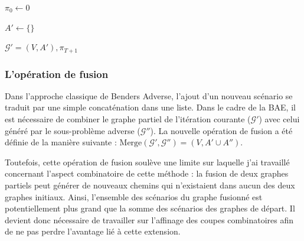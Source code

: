 \documentclass[12pt, a4paper, twoside]{article}
\numberwithin{equation}{section}
\begin{document}
    \begin{algorithm}[H]
        \caption{Adv\_subGraph}
        \label{alg:adv_subgraph}
        
        
        $\pi_0 \gets 0$\;
        
        
        $A' \gets \{\}$\;
        
        
        \Return $\mathcal{G}'=(V, A'), \pi_{T+1}$\;
    \end{algorithm}

	\subsubsection{L'opération de fusion}

	Dans l'approche classique de Benders Adverse, l'ajout d'un nouveau scénario se traduit par une simple concaténation dans une liste. Dans le cadre de la BAE, il est nécessaire de combiner le graphe partiel de l'itération courante ($\mathcal{G}'$) avec celui généré par le sous-problème adverse ($\mathcal{G}''$). La nouvelle opération de fusion a été définie de la manière suivante : $\text{Merge}(\mathcal{G}', \mathcal{G}'')=(V, A'\cup A'')$.
	
	Toutefois, cette opération de fusion soulève une limite sur laquelle j'ai travaillé concernant l'aspect combinatoire de cette méthode \cite{portoleauTHESIS} : la fusion de deux graphes partiels peut générer de nouveaux chemins qui n'existaient dans aucun des deux graphes initiaux. Ainsi, l'ensemble des scénarios du graphe fusionné est potentiellement plus grand que la somme des scénarios des graphes de départ. Il devient donc nécessaire de travailler sur l'affinage des coupes combinatoires afin de ne pas perdre l'avantage lié à cette extension.
	
\end{document}

